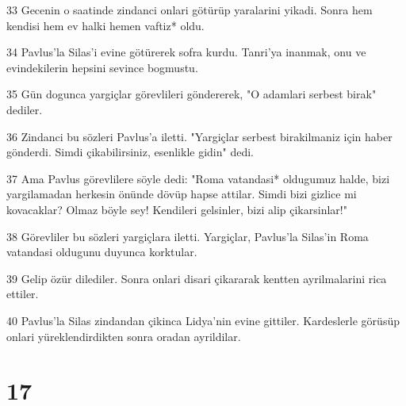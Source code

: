 \par 33 Gecenin o saatinde zindanci onlari götürüp yaralarini yikadi. Sonra hem kendisi hem ev halki hemen vaftiz* oldu.
\par 34 Pavlus'la Silas'i evine götürerek sofra kurdu. Tanri'ya inanmak, onu ve evindekilerin hepsini sevince bogmustu.
\par 35 Gün dogunca yargiçlar görevlileri göndererek, "O adamlari serbest birak" dediler.
\par 36 Zindanci bu sözleri Pavlus'a iletti. "Yargiçlar serbest birakilmaniz için haber gönderdi. Simdi çikabilirsiniz, esenlikle gidin" dedi.
\par 37 Ama Pavlus görevlilere söyle dedi: "Roma vatandasi* oldugumuz halde, bizi yargilamadan herkesin önünde dövüp hapse attilar. Simdi bizi gizlice mi kovacaklar? Olmaz böyle sey! Kendileri gelsinler, bizi alip çikarsinlar!"
\par 38 Görevliler bu sözleri yargiçlara iletti. Yargiçlar, Pavlus'la Silas'in Roma vatandasi oldugunu duyunca korktular.
\par 39 Gelip özür dilediler. Sonra onlari disari çikararak kentten ayrilmalarini rica ettiler.
\par 40 Pavlus'la Silas zindandan çikinca Lidya'nin evine gittiler. Kardeslerle görüsüp onlari yüreklendirdikten sonra oradan ayrildilar.

\chapter{17}

